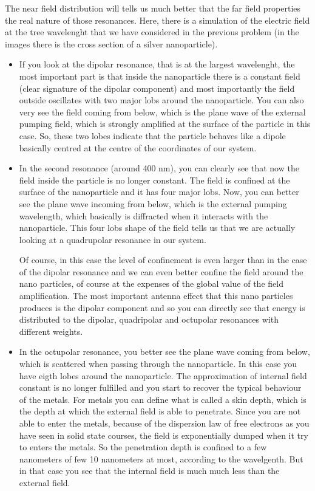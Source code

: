 \documentclass[../main/main.tex]{subfiles}
\begin{document}
The near field distribution will tells us much better that the far field properties the real nature of those resonances.
Here, there is a simulation of the electric field at the tree wavelenght that we have considered in the previous problem (in the images there is the cross section of a silver nanoparticle).

\begin{itemize}
\item If you look at the dipolar resonance, that is at the largest wavelenght, the most important part is that inside the nanoparticle there is a constant field (clear signature of the dipolar component) and most importantly the field outside oscillates with two major lobs around the nanoparticle. You can also very see the field coming from below, which is the plane wave of the external pumping field, which is strongly amplified at the surface of the particle in this case.
So, these two lobes indicate that the particle behaves like a dipole basically centred at the centre of the coordinates of our system.

\item In the second resonance (around 400 nm), you can clearly see that now the field inside the particle is no longer constant. The field is confined at the surface of the nanoparticle and it has four major lobs. Now, you can better see the plane wave incoming from below, which is the external pumping wavelength, which basically is diffracted when it interacts with the nanoparticle.
This four lobs shape of the field tells us that we are actually looking at a quadrupolar resonance in our system.

Of course, in this case the level of confinement is even larger than in the case of the dipolar resonance and we can even better confine the field around the nano particles, of course at the expenses of the global value of the field amplification.
The most important antenna effect that this nano particles produces is the dipolar component and so you can directly see that energy is distributed to the dipolar, quadripolar and octupolar resonances with different weights.

\item In the octupolar resonance, you better see the plane wave coming from below, which is scattered when passing through the nanoparticle.
In this case you have eigth lobes around the nanoparticle.
The approximation of internal field constant is no longer fulfilled and you start to recover the typical behaviour of the metals.
For metals you can define what is called a skin depth, which is the depth at which the external field is able to penetrate. Since you are not able to enter the metals, because of the dispersion law of free electrons as you have seen in solid state courses, the field is exponentially dumped when it try to enters the metals.
So the penetration depth is confined to a few nanometers of few 10 nanometers at most, according to the wavelgenth. But in that case you see that the internal field is much much less than the external field.


\end{itemize}
\end{document}
